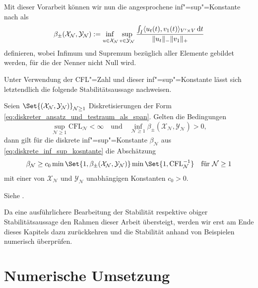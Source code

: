 \documentclass[../main.tex]{subfiles}
\begin{document}
Mit dieser Vorarbeit können wir nun die angesprochene inf"=sup"=Konstante nach \cite[57]{Andreev:2012ep} als
\begin{equation}
    \beta_{\pm}(\mathcal X_{\mathcal N}, \mathcal Y_{\mathcal N}) := \infsup{u \in \mathcal X_{\mathcal N}}{v \in \mathcal Y_{\mathcal N}} \frac{\int_{I} \skp{u_t(t)}{v_{1}(t)}{V' \times V} \diff t}{\norm{u_t}_{-} \norm{v_{1}}_{+}}
\end{equation}
definieren, wobei Infimum und Supremum bezüglich aller Elemente gebildet werden, für die der Nenner nicht Null wird.

Unter Verwendung der CFL"=Zahl und dieser inf"=sup"=Konstante lässt sich letztendlich die folgende Stabilitätsaussage nachweisen.

\begin{Satz}\label{satz:untere_schranke_fuer_infsup_nach_andreev}
    Seien $\Set{(\mathcal X_{\mathcal N}, \mathcal Y_{\mathcal N})}_{\mathcal N \geq 1}$ Diskretisierungen der Form \cref{eq:diskreter_ansatz_und_testraum_als_span}.
    Gelten die Bedingungen
    \begin{equation}
        \sup_{\mathcal N \geq 1} \mathrm{CFL}_{\mathcal N} < \infty
        \quad \text{und} \quad
        \inf_{\mathcal N \geq 1} \beta_{\pm}(\mathcal X_{\mathcal N}, \mathcal Y_{\mathcal N}) > 0,
    \end{equation}
    dann gilt für die diskrete inf"=sup"=Konstante $\beta_{\mathcal N}$ aus \cref{eq:diskrete_inf_sup_kosntante} die Abschätzung
    \begin{equation}
        \beta_{\mathcal N} \geq c_{0} \min\Set{1, \beta_{\pm}(\mathcal X_{\mathcal N}, \mathcal Y_{\mathcal N})} \min\Set{1, \mathrm{CFL}_{\mathcal N}^{-1}} \quad \text{für } \mathcal N \geq 1
    \end{equation}
    mit einer von $\mathcal X_{\mathcal N}$ und $\mathcal Y_{\mathcal N}$ unabhängigen Konstanten $c_{0} > 0$.
    \begin{Beweis}
        Siehe \cite[Subsection 5.2.2]{Andreev:2012ep}.
    \end{Beweis}
\end{Satz}

Da eine ausführlichere Bearbeitung der Stabilität respektive obiger Stabilitätsaussage den Rahmen dieser Arbeit übersteigt, werden wir erst am Ende dieses Kapitels dazu zurückkehren und die Stabilität anhand von Beispielen numerisch überprüfen.


\section{Numerische Umsetzung} %
\label{section:galerkin_numerische_umsetzung}
\end{document}
